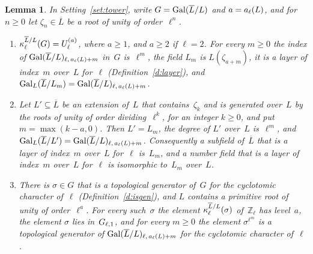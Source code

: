\documentclass[11pt,a4paper]{article}
\newcommand{\Z}{\mathbb{Z}}
\newcommand{\m}[1]{\mbox{$#1$}}        %
\theoremstyle{plainx}
\newtheorem{lemma}[theorem]{Lemma}
\theoremstyle{uprightx}
\begin{document}
\begin{lemma}\label{l:layers}
In Setting~\ref{set:tower}, write \m{G=\GalG{L}{\overline L}} and \m{a=\cZero{\ell}{L}}, and for \m{n\ge0} let
\m{\zeta_n\in\overline L} be a root of unity of order~$\ell^n$.
\begin{enumerate}[label=\textup{(\alph*)},topsep=2pt,itemsep=2pt]
\item \m{\cyc{L}{\overline L}{\ell}{G}=\princ{\ell}{a}}, where \m{a\ge1}, and \m{a\ge2} if \m{\ell=2}. For every
\m{m\ge0} the index of \m{\layU{\ell}{L}{\overline L}{m}} in~$G$ is~$\ell^m$, the field $L_m$ is
\m{L(\zeta_{a+m})}, it is a layer of index~$m$ over~$L$ for~$\ell$ (Definition~\ref{d:layer}), and
\m{\galOf{L}{L_m}{\overline L}=\layU{\ell}{L}{\overline L}{m}}.
\item Let \m{L'\subseteq\overline L} be an extension of~$L$ that contains~$\zeta_k$ and is generated over~$L$ by the
roots of unity of order dividing~$\ell^k$, for an integer \m{k\ge0}, and put \m{m=\max(k-a,0)}. Then
\m{L'=L_m}, the degree of $L'$ over~$L$ is~$\ell^m$, and
\m{\galOf{L}{L'}{\overline L}=\layU{\ell}{L}{\overline L}{m}}. Consequently a subfield of~$\overline L$ that is a layer
of index~$m$ over~$L$ for~$\ell$ is~$L_m$, and a number field that is a layer of index~$m$ over~$L$ for~$\ell$ is
isomorphic to~$L_m$ over~$L$.
\item There is \m{\sigma\in G} that is a topological generator of~$G$ for the cyclotomic character of~$\ell$
(Definition~\ref{d:isgen}), and $L$ contains a primitive root of unity of order~$\ell^a$. For every such~$\sigma$
the element \m{\cyc{L}{\overline L}{\ell}{\sigma}} of~$\Z_\ell$ has level~$a$, the element $\sigma$ lies
in~$G_{\ell,1}$, and for every \m{m\ge0} the element $\sigma^{\ell^m}$ is a topological generator of
\m{\layU{\ell}{L}{\overline L}{m}} for the cyclotomic character of~$\ell$.
\end{enumerate}
\end{lemma}
\end{document}
